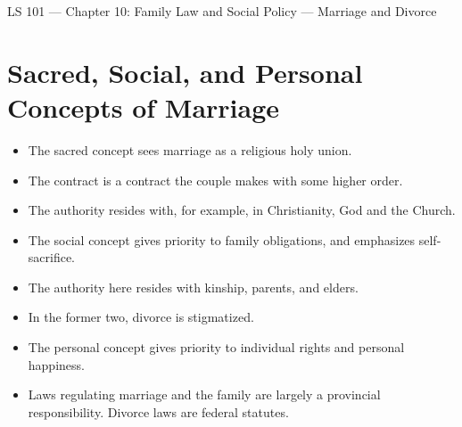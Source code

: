 \documentclass{article}
\author{Clement Tsang}
\begin{document}
\begin{center}
    \Large{LS 101 --- Chapter 10: Family Law and Social Policy --- Marriage and Divorce}
\end{center}

\section{Sacred, Social, and Personal Concepts of Marriage}
\begin{itemize}
    \item The sacred concept sees marriage as a religious holy union.
    \item The contract is a contract the couple makes with some higher order.
    \item The authority resides with, for example, in Christianity, God and the Church.
    \item The social concept gives priority to family obligations, and emphasizes self-sacrifice.
    \item The authority here resides with kinship, parents, and elders.
    \item In the former two, divorce is stigmatized.
    \item The personal concept gives priority to individual rights and personal happiness.
    \item Laws regulating marriage and the family are largely a provincial responsibility.  Divorce laws are federal statutes.
\end{itemize}
\end{document}
